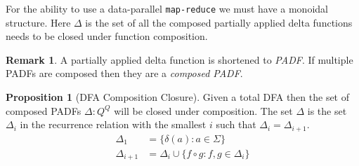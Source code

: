 \documentclass[a4paper,12pt]{article}
\theoremstyle{definition}
\newtheorem{proposition}{Proposition}[section]
\newtheorem*{remark}{Remark}
\begin{document}
For the ability to use a data-parallel \texttt{map-reduce} we must have a monoidal structure. Here $\Delta$ is the set of all the composed partially applied delta functions needs to be closed under function composition.
\begin{remark}
  A partially applied delta function is shortened to \textit{PADF}. If multiple PADFs are composed then they are a \textit{composed PADF}.
\end{remark}

\begin{proposition}[DFA Composition Closure]\label{prop:closure}
  Given a total DFA then the set of composed PADFs $\Delta: Q^Q$ will be closed under composition. The set $\Delta$ is the set $\Delta_i$ in the recurrence relation with the smallest $i$ such that $\Delta_i = \Delta_{i + 1}$.
  \begin{align*}
    \Delta_1 &= \{\delta(a) : a \in \Sigma \} \\
    \Delta_{i + 1} &= \Delta_i \cup \{f \circ g : f, g \in \Delta_i\}
  \end{align*}
\end{proposition}
\end{document}
